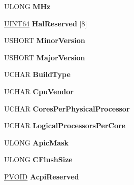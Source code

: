 \begin{DoxyCompactItemize}
\begin{tabbing}
\end{tabbing}\item 
\mbox{\label{struct___k_p_r_c_b_afde6e06880c1db45edabfe692f6c87bf}} 
U\+L\+O\+NG {\bfseries M\+Hz}
\item 
\mbox{\label{struct___k_p_r_c_b_a0ca0f50f457fc526aaf0e13ee95643f2}} 
\hyperlink{_processor_bind_8h_a57be03562867144161c1bfee95ca8f7c}{U\+I\+N\+T64} {\bfseries Hal\+Reserved} \mbox{[}8\mbox{]}
\item 
\mbox{\label{struct___k_p_r_c_b_a2214cbe66503695d85c5f80128753113}} 
U\+S\+H\+O\+RT {\bfseries Minor\+Version}
\item 
\mbox{\label{struct___k_p_r_c_b_a59f161426d750082f41ad301afa8dbc4}} 
U\+S\+H\+O\+RT {\bfseries Major\+Version}
\item 
\mbox{\label{struct___k_p_r_c_b_a3b8ad775ff826bef365488c92790c9b9}} 
U\+C\+H\+AR {\bfseries Build\+Type}
\item 
\mbox{\label{struct___k_p_r_c_b_a678c881e8fe7fda8bee7977a0c6d95ce}} 
U\+C\+H\+AR {\bfseries Cpu\+Vendor}
\item 
\mbox{\label{struct___k_p_r_c_b_a072c0b8022feabd79aa66fe3bb983d6f}} 
U\+C\+H\+AR {\bfseries Cores\+Per\+Physical\+Processor}
\item 
\mbox{\label{struct___k_p_r_c_b_ad989c2e8e891285508801b78c18b6445}} 
U\+C\+H\+AR {\bfseries Logical\+Processors\+Per\+Core}
\item 
\mbox{\label{struct___k_p_r_c_b_a3d197e8eb0648d1cc861a844f90d1f47}} 
U\+L\+O\+NG {\bfseries Apic\+Mask}
\item 
\mbox{\label{struct___k_p_r_c_b_ac2ff35e1a97565e9235b88ac8cd59cd2}} 
U\+L\+O\+NG {\bfseries C\+Flush\+Size}
\item 
\mbox{\label{struct___k_p_r_c_b_a44812695ecda56325ca61de4ca3ec706}} 
\hyperlink{interfacevoid}{P\+V\+O\+ID} {\bfseries Acpi\+Reserved}

\end{DoxyCompactItemize}
